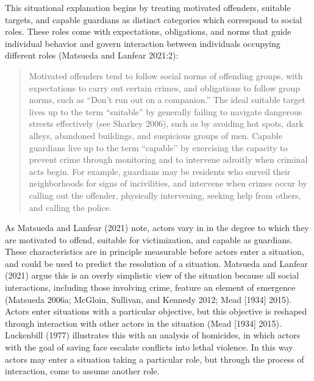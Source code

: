\documentclass [11pt, proquest] {uwthesis}[2015/03/03]
\begin{document}
This situational explanation begins by treating motivated offenders, suitable targets, and capable guardians as distinct categories which correspond to social roles. These roles come with expectations, obligations, and norms that guide individual behavior and govern interaction between individuals occupying different roles (Matsueda and Lanfear 2021:2):
\begin{quote}
Motivated offenders tend to follow social norms of offending groups, with expectations to carry out certain crimes, and obligations to follow group norms, such as ``Don't run out on a companion.'' The ideal suitable target lives up to the term ``suitable'' by generally failing to navigate dangerous streets effectively (see Sharkey 2006), such as by avoiding hot spots, dark alleys, abandoned buildings, and suspicious groups of men. Capable guardians live up to the term ``capable'' by exercising the capacity to prevent crime through monitoring and to intervene adroitly when criminal acts begin. For example, guardians may be residents who surveil their neighborhoods for signs of incivilities, and intervene when crimes occur by calling out the offender, physically intervening, seeking help from others, and calling the police.
\end{quote}
As Matsueda and Lanfear (2021) note, actors vary in in the degree to which they are motivated to offend, suitable for victimization, and capable as guardians. These characteristics are in principle measurable before actors enter a situation, and could be used to predict the resolution of a situation. Matsueda and Lanfear (2021) argue this is an overly simplistic view of the situation because all social interactions, including those involving crime, feature an element of emergence (Matsueda 2006a; McGloin, Sullivan, and Kennedy 2012; Mead {[}1934{]} 2015). Actors enter situations with a particular objective, but this objective is reshaped through interaction with other actors in the situation (Mead {[}1934{]} 2015). Luckenbill (1977) illustrates this with an analysis of homicides, in which actors with the goal of saving face escalate conflicts into lethal violence. In this way actors may enter a situation taking a particular role, but through the process of interaction, come to assume another role.
\end{document}
